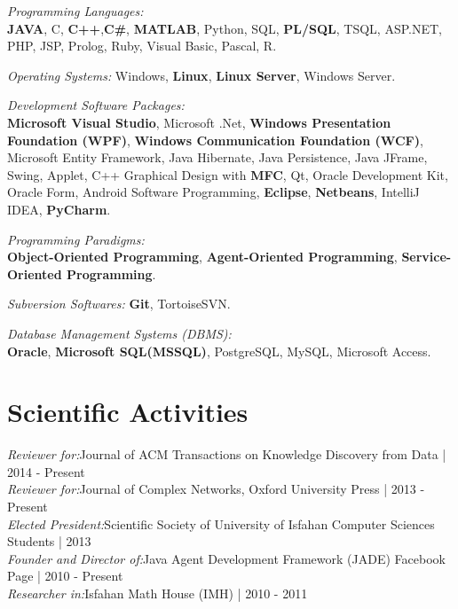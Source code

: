 \documentclass[letter]{res}
\begin{document}
\begin{resume}
\textit{Programming Languages:}\\
\textbf{JAVA}, C, \textbf{C++},\textbf{C\#}, \textbf{MATLAB}, Python, SQL, \textbf{PL/SQL}, TSQL, ASP.NET, PHP, JSP, Prolog, Ruby, Visual Basic, Pascal, R.
\vspace{-2mm}

\textit{Operating Systems:} Windows, \textbf{Linux}, \textbf{Linux Server}, Windows Server.
\vspace{-2mm}

\textit{Development Software Packages:}\\
\textbf{Microsoft Visual Studio}, Microsoft .Net, \textbf{Windows Presentation Foundation (WPF)}, \textbf{Windows Communication Foundation (WCF)}, Microsoft Entity Framework,
Java Hibernate, Java Persistence, Java JFrame, Swing, Applet, C++ Graphical Design with \textbf{MFC}, Qt, Oracle Development Kit, Oracle Form, Android Software Programming, \textbf{Eclipse}, \textbf{Netbeans}, IntelliJ IDEA, \textbf{PyCharm}.\\
\vspace{-6mm}

\textit{Programming Paradigms:}\\
\textbf{Object-Oriented Programming}, \textbf{Agent-Oriented Programming}, \textbf{Service-Oriented Programming}.
\vspace{-6mm}

\textit{Subversion Softwares:} \textbf{Git}, TortoiseSVN.
\vspace{-2mm}
 
\textit{Database Management Systems (DBMS):}\\
\textbf{Oracle}, \textbf{Microsoft SQL(MSSQL)}, PostgreSQL, MySQL, Microsoft Access.
\vspace{-2mm}
 


\section{Scientific Activities}
{\sl Reviewer for:}Journal of ACM Transactions on Knowledge Discovery from Data | 2014 - Present\\
{\sl Reviewer for:}Journal of Complex Networks, Oxford University Press | 2013 - Present\\
{\sl Elected President:}Scientific Society of University of Isfahan Computer Sciences Students | 2013\\
{\sl Founder and Director of:}Java Agent Development Framework (JADE) Facebook Page | 2010 - Present\\
{\sl Researcher in:}Isfahan Math House (IMH) | 2010 - 2011



\end{resume}
\end{document}
